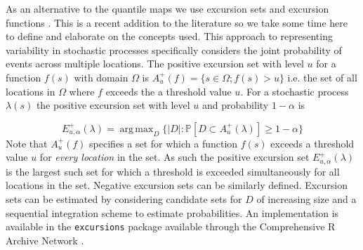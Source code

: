 \documentclass[preprint,12pt]{elsarticle}
\DeclareMathOperator*{\argmax}{arg\,max}  %
\begin{document}
As an alternative to the quantile maps we use excursion sets and excursion functions \citep{bolin_excursion_2015}.  This is a recent addition to the literature so we take some time here to define and elaborate on the concepts used.  This approach to representing variability in stochastic processes specifically considers the joint probability of events across multiple locations.  The positive excursion set with level $u$ for a function $f(s)$ with domain $\Omega$ is $A_u^{+}(f) = \{ s \in \Omega ; f(s) > u \}$ i.e. the set of all locations in $\Omega$ where $f$ exceeds the a threshold value $u$. For a stochastic process $\lambda(s)$ the positive excursion set with level $u$ and probability $1 - \alpha$ is
%

\begin{equation*}
E_{u,\alpha}^{+}(\lambda) = \argmax_{D}\{\lvert D \rvert : \mathbb{P}\left[D \subset A_u^{+}(\lambda)\right] \geq 1 - \alpha \}
\end{equation*}
Note that $A_u^{+}(f)$ specifies a set for which a function $f(s)$ exceeds a threshold value $u$ for \textit{every location} in the set.  As such the positive excursion set $E_{u,\alpha}^{+}(\lambda)$ is the largest such set for which a threshold is exceeded simultaneously for all locations in the set.  Negative excursion sets can be similarly defined.  Excursion sets can be estimated by considering candidate sets for $D$ of increasing size and a sequential integration scheme to estimate probabilities.  An implementation is available in the \texttt{excursions} package \citep{bolin_calculating_2018} available through the Comprehensive R Archive Network \citep{r_2017}.
\end{document}
